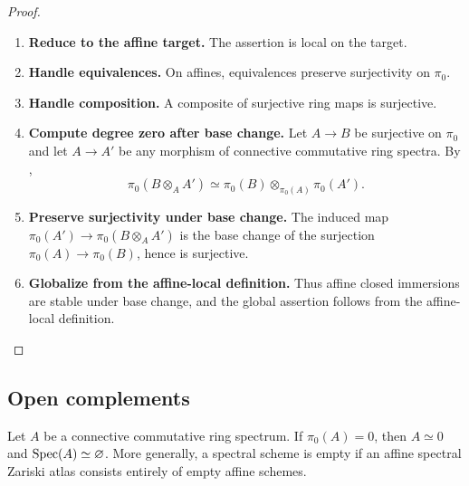 \begin{proof}
\leavevmode
\begin{enumerate}[label=\textup{(\arabic*)}]
    \item \textbf{Reduce to the affine target.}
    The assertion is local on the target.

    \item \textbf{Handle equivalences.}
    On affines, equivalences preserve
    surjectivity on \(\pi_0\).

    \item \textbf{Handle composition.}
    A composite of surjective ring maps is
    surjective.

    \item \textbf{Compute degree zero after base change.}
    Let \(A\to B\) be surjective on \(\pi_0\) and let \(A\to A'\) be any
    morphism of connective commutative ring spectra. By
    ,
    \[
        \pi_0(B\otimes_AA')
        \simeq
        \pi_0(B)\otimes_{\pi_0(A)}\pi_0(A').
    \]

    \item \textbf{Preserve surjectivity under base change.}
    The induced map
    \(\pi_0(A')\to\pi_0(B\otimes_AA')\) is the base change of the
    surjection \(\pi_0(A)\to\pi_0(B)\), hence is surjective.

    \item \textbf{Globalize from the affine-local definition.}
    Thus affine
    closed immersions are stable under base change, and the global assertion
    follows from the affine-local definition.
\end{enumerate}
\end{proof}

\subsection{Open complements}

\begin{lemma}
\label{lem:empty-spectral-scheme-classical-detection}
Let \(A\) be a connective commutative ring spectrum. If
\(\pi_0(A)=0\), then \(A\simeq0\) and \(\operatorname{Spec}(A)\simeq\varnothing\).
More generally, a spectral scheme is empty if an affine spectral Zariski
atlas consists entirely of empty affine schemes.
\end{lemma}

